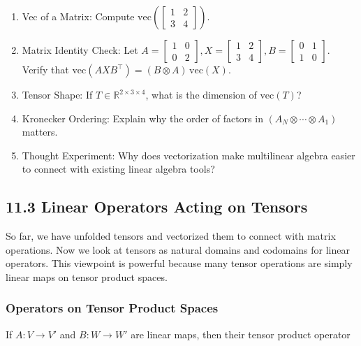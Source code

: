\documentclass[
  letterpaper,
  DIV=11,
  numbers=noendperiod]{scrreprt}
\begin{document}
\begin{enumerate}
\def\labelenumi{\arabic{enumi}.}
\item
  Vec of a Matrix: Compute
  \(\mathrm{vec}\left(\begin{bmatrix}1 & 2 \\ 3 & 4\end{bmatrix}\right)\).
\item
  Matrix Identity Check: Let
  \(A = \begin{bmatrix}1 & 0 \\ 0 & 2\end{bmatrix}, X = \begin{bmatrix}1 & 2 \\ 3 & 4\end{bmatrix}, B = \begin{bmatrix}0 & 1 \\ 1 & 0\end{bmatrix}\).
  Verify that
  \(\mathrm{vec}(AXB^\top) = (B \otimes A) \, \mathrm{vec}(X)\).
\item
  Tensor Shape: If \(T \in \mathbb{R}^{2 \times 3 \times 4}\), what is
  the dimension of \(\mathrm{vec}(T)\)?
\item
  Kronecker Ordering: Explain why the order of factors in
  \((A_N \otimes \cdots \otimes A_1)\) matters.
\item
  Thought Experiment: Why does vectorization make multilinear algebra
  easier to connect with existing linear algebra tools?
\end{enumerate}

\subsection{11.3 Linear Operators Acting on
Tensors}\label{linear-operators-acting-on-tensors}

So far, we have unfolded tensors and vectorized them to connect with
matrix operations. Now we look at tensors as natural domains and
codomains for linear operators. This viewpoint is powerful because many
tensor operations are simply linear maps on tensor product spaces.

\subsubsection{Operators on Tensor Product
Spaces}\label{operators-on-tensor-product-spaces}

If \(A: V \to V'\) and \(B: W \to W'\) are linear maps, then their
tensor product operator
\end{document}
